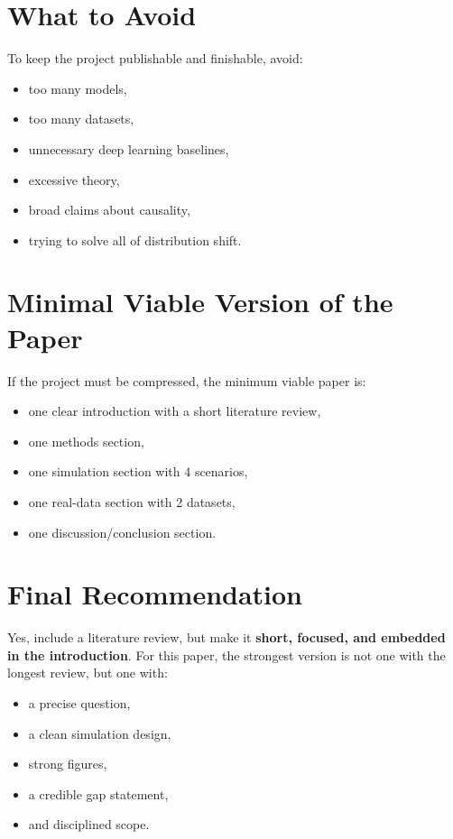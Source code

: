 \documentclass[11pt]{article}
\begin{document}
\section{What to Avoid}
To keep the project publishable and finishable, avoid:
\begin{itemize}
    \item too many models,
    \item too many datasets,
    \item unnecessary deep learning baselines,
    \item excessive theory,
    \item broad claims about causality,
    \item trying to solve all of distribution shift.
\end{itemize}

\section{Minimal Viable Version of the Paper}
If the project must be compressed, the minimum viable paper is:
\begin{itemize}
    \item one clear introduction with a short literature review,
    \item one methods section,
    \item one simulation section with 4 scenarios,
    \item one real-data section with 2 datasets,
    \item one discussion/conclusion section.
\end{itemize}

\section{Final Recommendation}
Yes, include a literature review, but make it \textbf{short, focused, and embedded in the introduction}. For this paper, the strongest version is not one with the longest review, but one with:
\begin{itemize}
    \item a precise question,
    \item a clean simulation design,
    \item strong figures,
    \item a credible gap statement,
    \item and disciplined scope.
\end{itemize}
\end{document}
